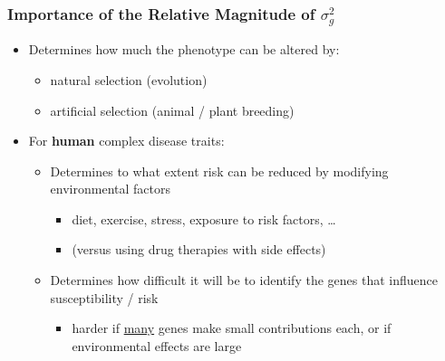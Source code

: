 \documentclass[10pt]{article}
\begin{document}
\subsubsection*{Importance of the Relative Magnitude of $\sigma_g^2$}
\begin{itemize}
	\item Determines how much the phenotype can be altered by:
	\begin{itemize}
	    \item natural selection (evolution)
	    \item artificial selection (animal / plant breeding)
    \end{itemize}
    \item For \textbf{human} complex disease traits:
    \begin{itemize}
	    \item Determines to what extent risk can be reduced by modifying environmental factors
	    \begin{itemize}
	        \item diet, exercise, stress, exposure to risk factors, \dots
	        \item (versus using drug therapies with side effects)
        \end{itemize}
        \item Determines how difficult it will be to identify the genes that influence susceptibility / risk
        \begin{itemize}
	        \item harder if \underline{many} genes make small contributions each, or if environmental effects are large
        \end{itemize}
    \end{itemize}
\end{itemize}
\end{document}
